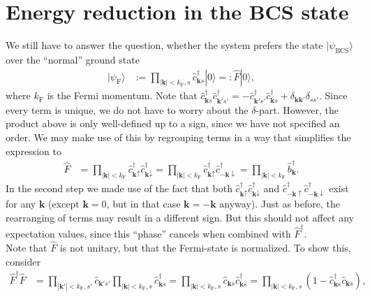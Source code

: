 \documentclass[english, parskip=full]{scrartcl}
\newcommand{\kla}{}
\newcommand{\tecxt}{}
\newcommand{\Ket}{}
\begin{document}
\section{Energy reduction in the BCS state}
We still have to answer the question, whether the system prefers the state $\Ket | \psi_\tecxt\text{BCS} \rangle$ over the ``normal'' ground state
\begin{align}
\Ket | \psi_\tecxt\text{F} \rangle &:= \prod_{|\textbf{k}| < k_\tecxt\text{F},s} \hat{c}_{\textbf{k}s}^\dagger \Ket | 0 \rangle =: \hat{F} \Ket | 0 \rangle,
\end{align}
where $k_\tecxt\text{F}$ is the Fermi momentum.
Note that $\hat{c}_{\textbf{k}s}^\dagger \hat{c}_{\textbf{k}'s'}^\dagger = - \hat{c}_{\textbf{k}'s'}^\dagger \hat{c}_{\textbf{k}s}^\dagger + \delta_{\textbf{k}\textbf{k}'} \delta_{ss'}$.
Since every term is unique, we do not have to worry about the $\delta$-part.
However, the product above is only well-defined up to a sign, since we have not specified an order.
We may make use of this by regrouping terms in a way that simplifies the expression to
\begin{align}
\hat{F} &= \prod_{|\textbf{k}|<k_\tecxt\text{F}} \hat{c}_{\textbf{k}\uparrow}^\dagger \hat{c}_{\textbf{k}\downarrow}^\dagger = \prod_{|\textbf{k}|<k_\tecxt\text{F}} \hat{c}_{\textbf{k}\uparrow}^\dagger \hat{c}_{-\textbf{k}\downarrow}^\dagger = \prod_{|\textbf{k}|<k_\tecxt\text{F}} \hat{b}_\textbf{k}^\dagger.
\end{align}
In the second step we made use of the fact that both $\hat{c}_{\textbf{k}\uparrow}^\dagger \hat{c}_{\textbf{k}\downarrow}^\dagger$ and $\hat{c}_{-\textbf{k}\uparrow}^\dagger \hat{c}_{-\textbf{k}\downarrow}^\dagger$ exist for any $\textbf{k}$ (except $\textbf{k}=0$, but in that case $\textbf{k}=-\textbf{k}$ anyway).
Just as before, the rearranging of terms may result in a different sign.
But this should not affect any expectation values, since this ``phase'' cancels when combined with $\hat{F}^\dagger$.
\\
Note that $\hat{F}$ is not unitary, but that the Fermi-state is normalized.
To show this, consider
\begin{align}
\hat{F}^\dagger\hat{F} &= \prod_{|\textbf{k}'|<k_\tecxt\text{F}, s'} \hat{c}_{\textbf{k}'s'} \prod_{|\textbf{k}|<k_\tecxt\text{F}, s} \hat{c}_{\textbf{k}s}^\dagger = \prod_{|\textbf{k}| < k_\tecxt\text{F}, s} \hat{c}_{\textbf{k}s} \hat{c}_{\textbf{k}s}^\dagger = \prod_{|\textbf{k}| < k_\tecxt\text{F}, s}  \kla\left( 1 - \hat{c}_{\textbf{k}s}^\dagger \hat{c}_{\textbf{k}s}  \right) ,
\end{align}
\end{document}

